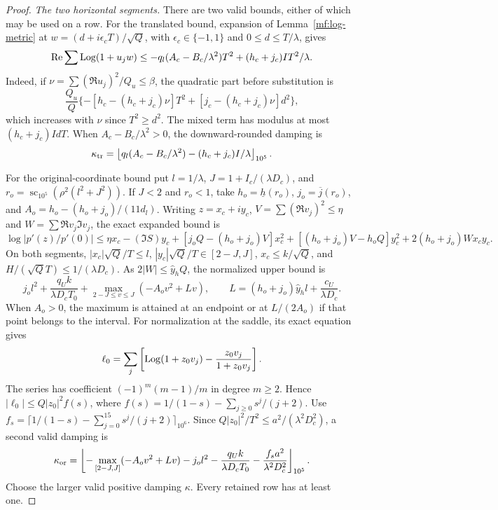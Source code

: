 \begin{proof}
\smallskip
\noindent\emph{The two horizontal segments.}
There are two valid bounds, either of which may be used on a row.
For the translated bound, expansion of Lemma~\ref{mf:log-metric}
at $w=(d+i\epsilon_c T)/\sqrt Q$, with
$\epsilon_c\in\{-1,1\}$ and $0\le d\le T/\lambda$, gives
\[
 \operatorname{Re}\sum\operatorname{Log}(1+u_jw)
 \le-q_l(A_c-B_c/\lambda^2)T^2
           +(h_c+j_c)IT^2/\lambda.
\]
Indeed, if $\nu=\sum(\Re u_j)^2/Q_u\le\beta$, the quadratic
part before substitution is
\[
 \frac{Q_u}{Q}\{-[h_c-(h_c+j_c)\nu]T^2
                  +[j_c-(h_c+j_c)\nu]d^2\},
\]
which increases with $\nu$ since $T^2\ge d^2$.
The mixed term has modulus at most $(h_c+j_c)IdT$.
When $A_c-B_c/\lambda^2>0$, the downward-rounded damping is
\[
 \kappa_{\rm tr}=
 \left\lfloor q_l(A_c-B_c/\lambda^2)
                  -(h_c+j_c)I/\lambda\right\rfloor_{10^5}.
\]

For the original-coordinate bound put
$l=1/\lambda$, $J=1+I_c/(\lambda D_c)$, and
$r_o=\operatorname{sc}_{10^5}(\rho^2(l^2+J^2))$.
If $J<2$ and $r_o<1$, take $h_o=\underline h(r_o)$,
$j_o=\overline j(r_o)$, and
$A_o=h_o-(h_o+j_o)/(11d_l)$.
Writing $z=x_c+iy_c$, $V=\sum(\Re v_j)^2\le\eta$ and
$W=\sum\Re v_j\Im v_j$, the exact expanded bound is
\[
 \log|p'(z)/p'(0)|
 \le\eta x_c-(\Im S)y_c
 +[j_oQ-(h_o+j_o)V]x_c^2
 +[(h_o+j_o)V-h_oQ]y_c^2+2(h_o+j_o)Wx_cy_c.
\]
On both segments,
$|x_c|\sqrt Q/T\le l$,
$|y_c|\sqrt Q/T\in[2-J,J]$,
$x_c\le k/\sqrt Q$, and $H/(\sqrt Q T)\le1/(\lambda D_c)$.
As $2|W|\le\widehat y_hQ$, the normalized upper bound is
\[
 j_ol^2+\frac{q_Uk}{\lambda D_cT_0}
 +\max_{2-J\le v\le J}(-A_ov^2+Lv),\qquad
 L=(h_o+j_o)\widehat y_hl+\frac{c_U}{\lambda D_c}.
\]
When $A_o>0$, the maximum is attained at an endpoint or at
$L/(2A_o)$ if that point belongs to the interval.
For normalization at the saddle, its exact equation gives
\[
 \ell_0=\sum_j\left[\operatorname{Log}(1+z_0v_j)
                      -\frac{z_0v_j}{1+z_0v_j}\right].
\]
The series has coefficient $(-1)^m(m-1)/m$ in degree
$m\ge2$. Hence $|\ell_0|\le Q|z_0|^2f(s)$, where
$f(s)=1/(1-s)-\sum_{j\ge0}s^j/(j+2)$.
Use
$f_s=\lceil1/(1-s)-\sum_{j=0}^{15}s^j/(j+2)\rceil_{10^6}$.
Since $Q|z_0|^2/T^2\le a^2/(\lambda^2D_c^2)$, a second
valid damping is
\[
 \kappa_{\rm or}=\left\lfloor
 -\max_{[2-J,J]}(-A_ov^2+Lv)-j_ol^2
 -\frac{q_Uk}{\lambda D_cT_0}
 -\frac{f_sa^2}{\lambda^2D_c^2}\right\rfloor_{10^5}.
\]
Choose the larger valid positive damping $\kappa$.
Every retained row has at least one.


\end{proof}

